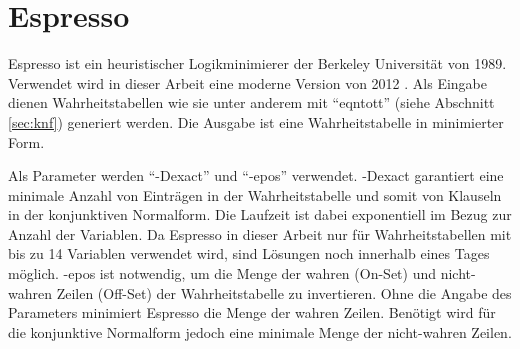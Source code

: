 \section{Espresso}
\label{sec:espresso}

Espresso ist ein heuristischer Logikminimierer der Berkeley Universität von 1989. Verwendet wird in dieser
Arbeit eine moderne Version von 2012 \cite{espressobin}. Als Eingabe dienen Wahrheitstabellen wie sie
unter anderem mit "`eqntott"' (siehe Abschnitt \ref{sec:knf}) generiert werden. Die Ausgabe ist eine
Wahrheitstabelle in minimierter Form.

Als Parameter werden "`-Dexact"' und "`-epos"' verwendet. -Dexact garantiert eine minimale Anzahl von
Einträgen in der Wahrheitstabelle und somit von Klauseln in der konjunktiven Normalform. Die Laufzeit
ist dabei exponentiell im Bezug zur Anzahl der Variablen. Da Espresso in dieser Arbeit nur für
Wahrheitstabellen mit bis zu 14 Variablen verwendet wird, sind Lösungen noch innerhalb eines Tages möglich.
-epos ist notwendig, um die Menge der wahren (On-Set) und nicht-wahren Zeilen (Off-Set) der Wahrheitstabelle
zu invertieren. Ohne die Angabe des Parameters minimiert Espresso die Menge der wahren Zeilen. Benötigt
wird für die konjunktive Normalform jedoch eine minimale Menge der nicht-wahren Zeilen.